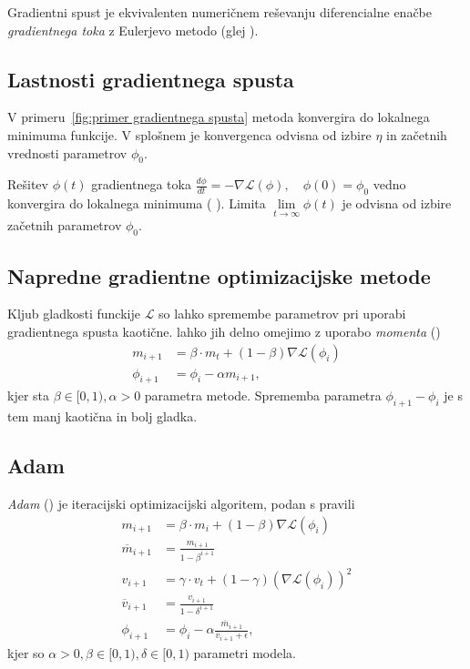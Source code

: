 \documentclass[mat2, tisk]{fmfdelo}
\newcommand{\TODO}[1]{{\color{blue} TODO: #1}}
\newcommand{\loss }{\mathcal L}
\begin{document}
Gradientni spust je ekvivalenten numeričnem reševanju diferencialne
enačbe \emph{gradientnega toka} z Eulerjevo metodo (glej
\cite{dherin2025learningsolvingdifferentialequations}).

\subsection{Lastnosti gradientnega spusta}
V primeru~\ref{fig:primer gradientnega spusta} metoda konvergira do
lokalnega minimuma funkcije.
V splošnem je konvergenca odvisna od izbire  $\eta$ in začetnih
vrednosti parametrov $\phi_0$.

Rešitev $\phi(t)$ gradientnega toka $  \frac{d\phi}{d t} = - \nabla
\mathcal{L}(\phi), \quad \phi(0)=\phi_0$ vedno konvergira do
lokalnega minimuma (\cite[stran 203]{Hirsch2012dynamical-systems} ).
Limita $\lim \limits_{t \to \infty} \phi(t)$
je odvisna od izbire začetnih parametrov $\phi_0$.
%
\subsection{Napredne gradientne optimizacijske metode}
Kljub gladkosti funckije $\loss$ so lahko spremembe parametrov pri
uporabi gradientnega spusta kaotične. lahko jih delno omejimo z
uporabo \emph{momenta} (\cite[stran 86]{prince2023understandingdeeplearning})
\begin{align*}
  m_{i+1} &= \beta \cdot m_t + (1-\beta) \nabla \loss (\phi_i) \\
  \phi_{i+1} &= \phi_i -  \alpha m_{i+1},
\end{align*}
kjer sta $\beta \in [0,1), \alpha > 0$ parametra metode. Sprememba
parametra $\phi_{i+1} - \phi_i$ je s tem manj kaotična in bolj gladka.
\subsection{Adam}
\label{adam}
\emph{Adam} (\cite[stran 88]{prince2023understandingdeeplearning}) je
iteracijski optimizacijski algoritem, podan s pravili
\begin{align*}
  m_{i+1} &= \beta \cdot m_i + (1-\beta) \nabla \loss (\phi_i) \\
  \overline{m}_{i+1} &= \frac{m_{i+1}}{1 - \beta ^{i+1}}\\
  v_{i+1} &= \gamma \cdot v_t + (1-\gamma) (\nabla \loss (\phi_i))^2 \\
  \overline{v}_{i+1} &= \frac{v_{i+1}}{1 - \delta ^{i+1}}\\
  \phi_{i+1} &= \phi_i -  \alpha
  \frac{\overline{m}_{i+1}}{\overline{v}_{i+1} + \epsilon},
\end{align*}
kjer so $\alpha > 0, \beta \in [0,1), \delta \in [0,1 )$ parametri modela.
\end{document}
